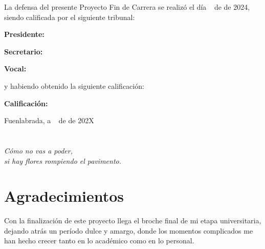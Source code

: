 \documentclass[a4paper, 12pt]{book}
\begin{document}
\vspace{1cm}
La defensa del presente Proyecto Fin de Carrera se realizó el día \qquad$\;\,$ de \qquad\qquad\qquad\qquad \newline de 2024, siendo calificada por el siguiente tribunal:


\vspace{0.5cm}
\textbf{Presidente:}

\vspace{1.2cm}
\textbf{Secretario:}

\vspace{1.2cm}
\textbf{Vocal:}


\vspace{1.2cm}
y habiendo obtenido la siguiente calificación:

\vspace{1cm}
\textbf{Calificación:}


\vspace{1cm}
\begin{flushright}
Fuenlabrada, a \qquad$\;\,$ de \qquad\qquad\qquad\qquad de 202X
\end{flushright}


\chapter*{}
\begin{flushright}
\textit{Cómo no vas a poder,}
\\\textit{si hay flores rompiendo el pavimento.}
\end{flushright}


\chapter*{Agradecimientos}

Con la finalización de este proyecto llega el broche final de mi etapa universitaria, dejando atrás un período dulce y amargo,
donde los momentos complicados me han hecho crecer tanto en lo académico como en lo personal.
\end{document}
